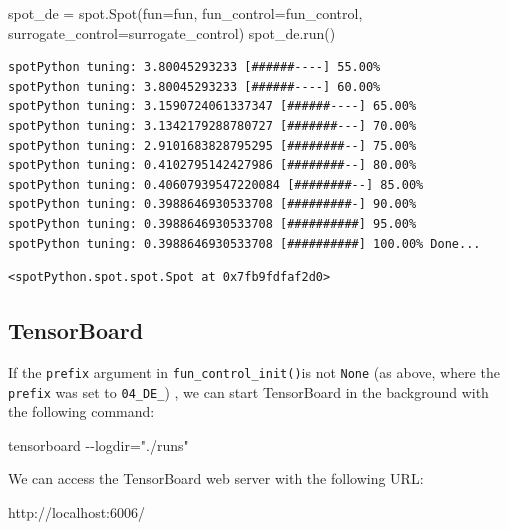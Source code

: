 \documentclass[
  letterpaper,
  DIV=11,
  numbers=noendperiod]{scrreprt}
\newenvironment{Shaded}{\begin{snugshade}}{\end{snugshade}}
\newcommand{\NormalTok}[1]{\textcolor[rgb]{0.00,0.23,0.31}{#1}}
\newcommand{\OperatorTok}[1]{\textcolor[rgb]{0.37,0.37,0.37}{#1}}
\begin{document}
\begin{Shaded}
\begin{Highlighting}[]
\NormalTok{spot\_de }\OperatorTok{=}\NormalTok{ spot.Spot(fun}\OperatorTok{=}\NormalTok{fun,}
\NormalTok{                    fun\_control}\OperatorTok{=}\NormalTok{fun\_control,}
\NormalTok{                    surrogate\_control}\OperatorTok{=}\NormalTok{surrogate\_control)}
\NormalTok{spot\_de.run()}
\end{Highlighting}
\end{Shaded}

\begin{verbatim}
spotPython tuning: 3.80045293233 [######----] 55.00% 
spotPython tuning: 3.80045293233 [######----] 60.00% 
spotPython tuning: 3.1590724061337347 [######----] 65.00% 
spotPython tuning: 3.1342179288780727 [#######---] 70.00% 
spotPython tuning: 2.9101683828795295 [########--] 75.00% 
spotPython tuning: 0.4102795142427986 [########--] 80.00% 
spotPython tuning: 0.40607939547220084 [########--] 85.00% 
spotPython tuning: 0.3988646930533708 [#########-] 90.00% 
spotPython tuning: 0.3988646930533708 [##########] 95.00% 
spotPython tuning: 0.3988646930533708 [##########] 100.00% Done...
\end{verbatim}

\begin{verbatim}
<spotPython.spot.spot.Spot at 0x7fb9fdfaf2d0>
\end{verbatim}

\subsection{TensorBoard}\label{tensorboard-1}

If the \texttt{prefix} argument in \texttt{fun\_control\_init()}is not
\texttt{None} (as above, where the \texttt{prefix} was set to
\texttt{04\_DE\_}) , we can start TensorBoard in the background with the
following command:

\begin{Shaded}
\begin{Highlighting}[]
\NormalTok{tensorboard {-}{-}logdir="./runs"}
\end{Highlighting}
\end{Shaded}

We can access the TensorBoard web server with the following URL:

\begin{Shaded}
\begin{Highlighting}[]
\NormalTok{http://localhost:6006/}
\end{Highlighting}
\end{Shaded}
\end{document}
